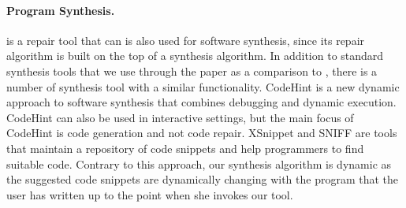 \paragraph{{\bf Program Synthesis.}}
\ourTool is a repair tool that can is also used for software synthesis, since its repair algorithm is 
built on the top of a synthesis algorithm. In addition to standard synthesis tools that we use through the paper as a comparison to \ourTool, there is a number of synthesis tool with a similar functionality. CodeHint \cite{CodeHint2014ICSE} is a new dynamic approach to software synthesis 
that combines debugging and dynamic execution. CodeHint can also be used in 
interactive settings, but the main focus of CodeHint is code generation and not code repair.
XSnippet \cite{Tansalarak06xsnippet:XSnippet} and SNIFF \cite{Chatterjee:2009:Sniff} are  tools that maintain a repository of code snippets and help programmers to find suitable code. Contrary to this approach, our synthesis algorithm is dynamic as the suggested code snippets are dynamically changing with the program that the user has written up to the point when she invokes our tool.

